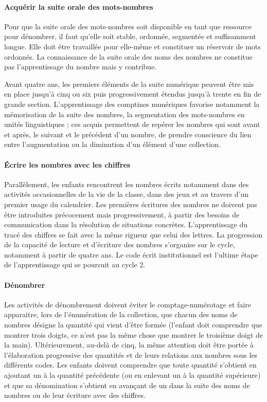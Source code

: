 \paragraph{Acquérir la suite orale des mots-nombres}
Pour que la suite orale des mots-nombres soit disponible en tant que ressource pour dénombrer, il faut qu’elle soit stable, ordonnée, segmentée et suffisamment longue. Elle doit être travaillée pour elle-même et constituer un réservoir de mots ordonnés. La connaissance de la suite orale des noms des nombres ne constitue pas l’apprentissage du nombre mais y contribue.

Avant quatre ans, les premiers éléments de la suite numérique peuvent être mis en place jusqu’à cinq ou six puis progressivement étendus jusqu’à trente en fin de grande section. L’apprentissage des comptines numériques favorise notamment la mémorisation de la suite des nombres, la segmentation des mots-nombres en unités linguistiques ; ces acquis permettent de repérer les nombres qui sont avant et après, le suivant et le précédent d’un nombre, de prendre conscience du lien entre l’augmentation ou la diminution d’un élément d’une collection. 

\paragraph{Écrire les nombres avec les chiffres}
Parallèlement, les enfants rencontrent les nombres écrits notamment dans des activités occasionnelles de la vie de la classe, dans des jeux et au travers d’un premier usage du calendrier. Les premières écritures des nombres ne doivent pas être introduites précocement mais progressivement, à partir des besoins de communication dans la résolution de situations concrètes. L’apprentissage du tracé des chiffres se fait avec la même rigueur que celui des lettres. La progression de la capacité de lecture et d’écriture des nombres s’organise sur le cycle, notamment à partir de quatre ans. Le code écrit institutionnel est l’ultime étape de l’apprentissage qui se poursuit au cycle 2.

\paragraph{Dénombrer}
Les activités de dénombrement doivent éviter le comptage-numérotage et faire apparaitre, lors de l’énumération de la collection, que chacun des noms de nombres désigne la quantité qui vient d’être formée (l’enfant doit comprendre que montrer trois doigts, ce n’est pas la même chose que montrer le troisième doigt de la main). Ultérieurement, au-delà de cinq, la même attention doit être portée à l’élaboration progressive des quantités et de leurs relations aux nombres sous les différents codes. Les enfants doivent comprendre que toute quantité s’obtient en ajoutant un à la quantité précédente (ou en enlevant un à la quantité supérieure) et que sa dénomination s’obtient en avançant de un dans la suite des noms de nombres ou de leur écriture avec des chiffres. 

